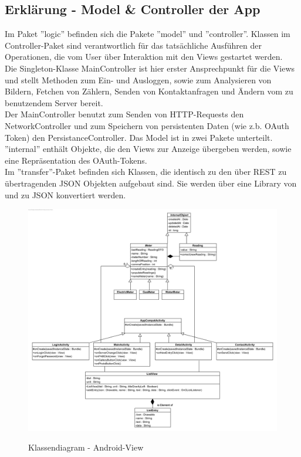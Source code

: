 \subsection*{Erklärung - Model \& Controller der App}
Im Paket ''logic'' befinden sich die Pakete ''model'' und ''controller''.
Klassen im Controller-Paket sind verantwortlich für das tatsächliche Ausführen der Operationen, die vom User über Interaktion mit den Views gestartet werden. \\ Die Singleton-Klasse MainController ist hier erster Ansprechpunkt für die Views und stellt Methoden zum Ein- und Ausloggen, sowie zum Analysieren von Bildern, Fetchen von Zählern, Senden von Kontaktanfragen und Ändern vom zu benutzendem Server bereit. \\ Der MainController benutzt zum Senden von HTTP-Requests den NetworkController und zum Speichern von persistenten Daten (wie z.b. OAuth Token) den PersistanceController.
Das Model ist in zwei Pakete unterteilt. ''internal'' enthält Objekte, die den Views zur Anzeige übergeben werden, sowie eine Repräsentation des OAuth-Tokens. \\ Im ''transfer''-Paket befinden sich Klassen, die identisch zu den über REST zu übertragenden JSON Objekten aufgebaut sind. Sie werden über eine Library von und zu JSON konvertiert werden.

\begin{figure}[H]
\hspace{-1cm}
\includegraphics[scale=0.95]{img/diagrams/Android-Class-Diagram-View}\\
\caption{Klassendiagram - Android-View}
\end{figure}


